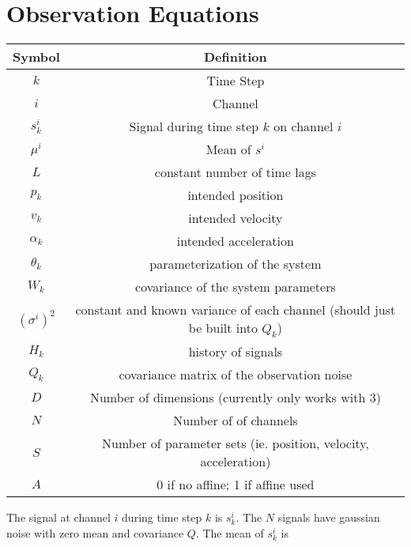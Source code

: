 \documentclass[]{article}
\begin{document}
\section{Observation Equations}

\begin{table}[H]
\begin{center}
\begin{tabular}{|c|c|}
\hline
Symbol & Definition \\
\hline
$k$ & Time Step \\
$i$ & Channel \\
$s_k^i$ & Signal during time step $k$ on channel $i$ \\
$\mu^i$ & Mean of $s^i$ \\
$L$ & constant number of time lags \\
$p_k$ & intended position \\
$v_k$ & intended velocity \\
$\alpha_k$ & intended acceleration \\
$\theta_k$ & parameterization of the system \\
$W_k$ & covariance of the system parameters \\
$(\sigma^i)^2$ & constant and known variance of each channel (should just be built into $Q_k$) \\
$H_k$ & history of signals \\
$Q_k$ & covariance matrix of the observation noise \\
$D$ & Number of dimensions (currently only works with 3) \\
$N$ & Number of of channels \\
$S$ & Number of parameter sets (ie. position, velocity, acceleration) \\
$A$ & 0 if no affine; 1 if affine used \\
\hline
\end{tabular}
\end{center}
\end{table}

The signal at channel $i$ during time step $k$ is $s_k^i$.
The $N$ signals have gaussian noise with zero mean and covariance $Q$.
The mean of $s_k^i$ is
\end{document}
